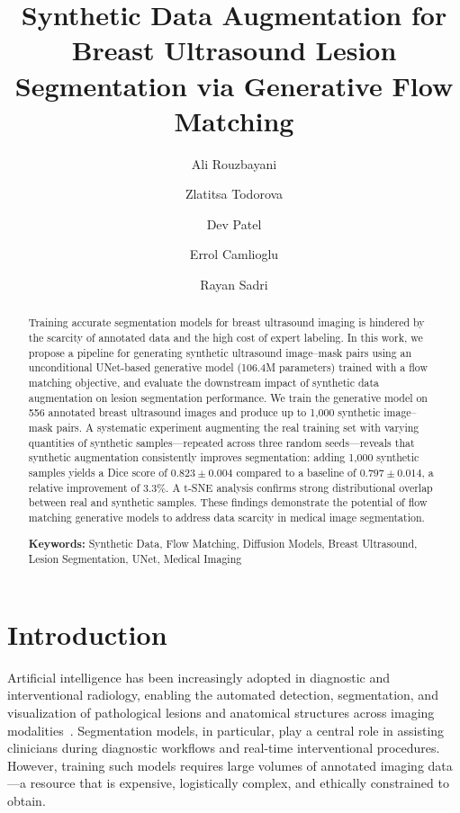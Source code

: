 \documentclass[twocolumn]{article}
\title{Synthetic Data Augmentation for Breast Ultrasound Lesion Segmentation via Generative Flow Matching}
\author[1]{Ali Rouzbayani}
\author[3]{Zlatitsa Todorova}
\author[3]{Dev Patel}
\author[3,4]{Errol Camlioglu}
\author[1]{Rayan Sadri}
\affil[1]{AI Research, Carez Inc., Austin, TX, USA}
\affil[3]{Faculty of Medicine and Health Sciences, McGill University, Montreal, QC, Canada}
\affil[4]{Department of Radiology, Jewish General Hospital, Montreal, QC, Canada}
\date{}
\begin{document}
\maketitle

\begin{abstract}
Training accurate segmentation models for breast ultrasound imaging is hindered by the scarcity of annotated data and the high cost of expert labeling. In this work, we propose a pipeline for generating synthetic ultrasound image--mask pairs using an unconditional UNet-based generative model (106.4M parameters) trained with a flow matching objective, and evaluate the downstream impact of synthetic data augmentation on lesion segmentation performance. We train the generative model on 556 annotated breast ultrasound images and produce up to 1{,}000 synthetic image--mask pairs. A systematic experiment augmenting the real training set with varying quantities of synthetic samples---repeated across three random seeds---reveals that synthetic augmentation consistently improves segmentation: adding 1{,}000 synthetic samples yields a Dice score of $0.823 \pm 0.004$ compared to a baseline of $0.797 \pm 0.014$, a relative improvement of 3.3\%. A t-SNE analysis confirms strong distributional overlap between real and synthetic samples. These findings demonstrate the potential of flow matching generative models to address data scarcity in medical image segmentation.

\medskip
\noindent\textbf{Keywords:} Synthetic Data, Flow Matching, Diffusion Models, Breast Ultrasound, Lesion Segmentation, UNet, Medical Imaging
\end{abstract}

\section{Introduction}
\label{sec:intro}

Artificial intelligence has been increasingly adopted in diagnostic and interventional radiology, enabling the automated detection, segmentation, and visualization of pathological lesions and anatomical structures across imaging modalities~\cite{litjens2017}. Segmentation models, in particular, play a central role in assisting clinicians during diagnostic workflows and real-time interventional procedures. However, training such models requires large volumes of annotated imaging data---a resource that is expensive, logistically complex, and ethically constrained to obtain.
\end{document}
